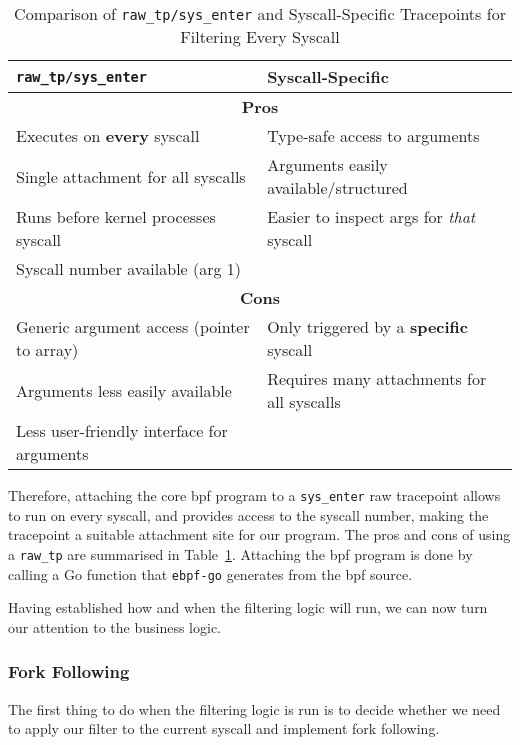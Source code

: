 \begin{table}[h!]
\centering
\caption{Comparison of \texttt{raw\_tp/sys\_enter} and Syscall-Specific Tracepoints for Filtering Every Syscall}
\begin{tabular}{|p{6cm}|p{6cm}|}
\hline
\texttt{raw\_tp/sys\_enter} & \textbf{Syscall-Specific} \\
\hline
\multicolumn{2}{|c|}{\textbf{Pros}} \\
\hline
Executes on \textbf{every} syscall & Type-safe access to arguments \\
Single attachment for all syscalls & Arguments easily available/structured \\
Runs before kernel processes syscall & Easier to inspect args for \textit{that} syscall \\
Syscall number available (arg 1) &  \\
\hline
\multicolumn{2}{|c|}{\textbf{Cons}} \\
\hline
Generic argument access (pointer to array) & Only triggered by a \textbf{specific} syscall \\
Arguments less easily available & Requires many attachments for all syscalls \\
Less user-friendly interface for arguments &  \\
\hline
\end{tabular}
\label{tab:tracepoint_comparison}
\end{table}

Therefore, attaching the core \ac{bpf} program to a \texttt{sys\_enter} raw
tracepoint allows \af to run on every syscall, and provides access to the
syscall number, making the tracepoint a suitable attachment site for our
program. The pros and cons of using a \texttt{raw\_tp} are summarised in
Table~\ref{tab:tracepoint_comparison}. Attaching the \ac{bpf} program is done by calling a Go function that
\texttt{ebpf-go} generates from the \ac{bpf} source. 

Having established how and when the \af filtering logic will run, we can now
turn our attention to the business logic.

\subsubsection{Fork Following}

The first thing to do when the filtering logic is run is to decide whether we
need to apply our filter to the current syscall and implement fork following. 

